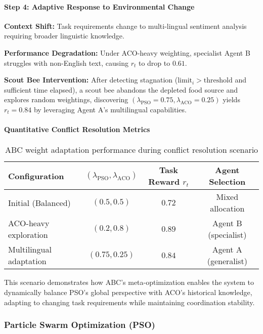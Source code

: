 \documentclass{article}
\begin{document}
\paragraph{Step 4: Adaptive Response to Environmental Change}

\textbf{Context Shift:} Task requirements change to multi-lingual sentiment analysis requiring broader linguistic knowledge.

\textbf{Performance Degradation:} Under ACO-heavy weighting, specialist Agent B struggles with non-English text, causing $r_t$ to drop to $0.61$.

\textbf{Scout Bee Intervention:} After detecting stagnation ($\text{limit}_i > \text{threshold}$ and sufficient time elapsed), a scout bee abandons the depleted food source and explores random weightings, discovering $(\lambda_{\text{PSO}} = 0.75, \lambda_{\text{ACO}} = 0.25)$ yields $r_t = 0.84$ by leveraging Agent A's multilingual capabilities.

\paragraph{Quantitative Conflict Resolution Metrics}

\begin{table}[h]
\centering
\caption{ABC weight adaptation performance during conflict resolution scenario}
\begin{tabular}{lccc}
\hline
\textbf{Configuration} & $(\lambda_{\text{PSO}}, \lambda_{\text{ACO}})$ & \textbf{Task Reward} $r_t$ & \textbf{Agent Selection} \\
\hline
Initial (Balanced) & $(0.5, 0.5)$ & $0.72$ & Mixed allocation \\
ACO-heavy exploration & $(0.2, 0.8)$ & $0.89$ & Agent B (specialist) \\
Multilingual adaptation & $(0.75, 0.25)$ & $0.84$ & Agent A (generalist) \\
\hline
\end{tabular}
\label{tab:conflict_resolution}
\end{table}

This scenario demonstrates how ABC's meta-optimization enables the system to dynamically balance PSO's global perspective with ACO's historical knowledge, adapting to changing task requirements while maintaining coordination stability.

\subsubsection{Particle Swarm Optimization (PSO)}
\label{subsubsec:pso}
\end{document}
